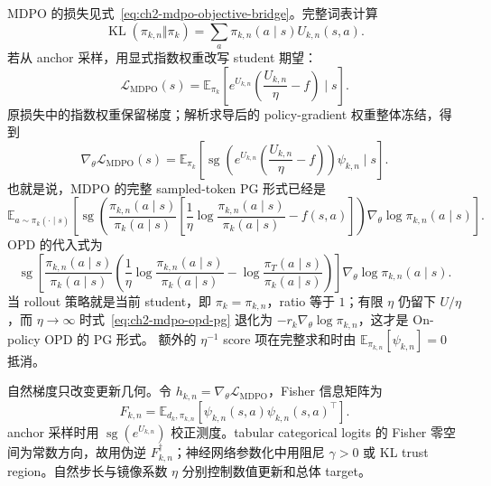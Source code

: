 MDPO 的损失见式~\eqref{eq:ch2-mdpo-objective-bridge}。完整词表计算
\begin{equation}
\operatorname{KL}(\pi_{k,n}\Vert\pi_k)
=\sum_a\pi_{k,n}(a\mid s)U_{k,n}(s,a).
\label{eq:ch2-mdpo-full-kl}
\end{equation}
若从 anchor 采样，用显式指数权重改写 student 期望：
\begin{equation}
\mathcal L_{\mathrm{MDPO}}(s)
=\mathbb E_{\pi_k}\left[e^{U_{k,n}}\left(\frac{U_{k,n}}\eta-f\right)\mid s\right].
\label{eq:ch2-mdpo-sample-integrand}
\end{equation}
原损失中的指数权重保留梯度；解析求导后的 policy-gradient 权重整体冻结，得到
\begin{equation}
\nabla_\theta\mathcal L_{\mathrm{MDPO}}(s)
=\mathbb E_{\pi_k}\left[\operatorname{sg}\!\left(e^{U_{k,n}}\left(\frac{U_{k,n}}\eta-f\right)\right)\psi_{k,n}\mid s\right].
\label{eq:ch2-mdpo-generic-gradient}
\end{equation}
也就是说，MDPO 的完整 sampled-token PG 形式已经是
\begin{equation}
\label{eq:ch2-mdpo-pg}
\mathbb E_{a\sim\pi_k(\cdot\mid s)}\left[
\operatorname{sg}\!\left(
\frac{\pi_{k,n}(a\mid s)}{\pi_k(a\mid s)}
\left[\frac1\eta\log\frac{\pi_{k,n}(a\mid s)}{\pi_k(a\mid s)}-f(s,a)\right]
\right)\nabla_\theta\log\pi_{k,n}(a\mid s)\right].
\end{equation}
OPD 的代入式为
\begin{equation}
\label{eq:ch2-mdpo-opd-pg}
\operatorname{sg}\!\left[
\frac{\pi_{k,n}(a\mid s)}{\pi_k(a\mid s)}
\left(\frac1\eta\log\frac{\pi_{k,n}(a\mid s)}{\pi_k(a\mid s)}
-\log\frac{\pi_T(a\mid s)}{\pi_k(a\mid s)}\right)
\right]\nabla_\theta\log\pi_{k,n}(a\mid s).
\end{equation}
当 rollout 策略就是当前 student，即 $\pi_k=\pi_{k,n}$，ratio 等于 $1$；有限
$\eta$ 仍留下 $U/\eta$，而 $\eta\to\infty$ 时式~\eqref{eq:ch2-mdpo-opd-pg}
退化为 $-r_k\nabla_\theta\log\pi_{k,n}$，这才是 On-policy OPD 的 PG 形式。
额外的 $\eta^{-1}$ score 项在完整求和时由 $\mathbb E_{\pi_{k,n}}[\psi_{k,n}]=0$ 抵消。

自然梯度只改变更新几何。令 $h_{k,n}=\nabla_\theta\mathcal L_{\mathrm{MDPO}}$，Fisher 信息矩阵为
\[
F_{k,n}=\mathbb E_{d_k,\pi_{k,n}}[\psi_{k,n}(s,a)\psi_{k,n}(s,a)^\top].
\]
anchor 采样时用 $\operatorname{sg}(e^{U_{k,n}})$ 校正测度。tabular categorical logits 的 Fisher 零空间为常数方向，故用伪逆 $F_{k,n}^{\dagger}$；神经网络参数化中用阻尼 $\gamma>0$ 或 KL trust region。自然步长与镜像系数 $\eta$ 分别控制数值更新和总体 target。

